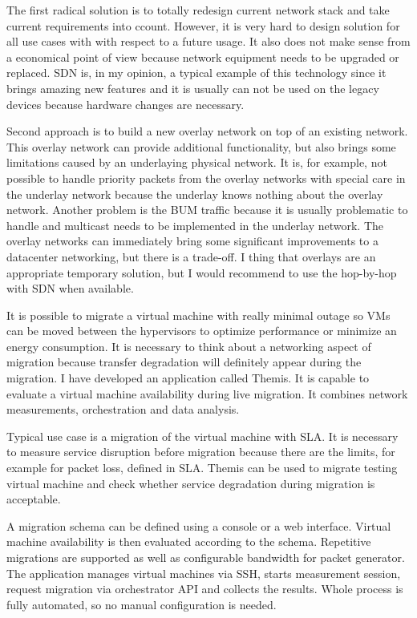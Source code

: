 The first radical solution is to totally redesign current network stack and take current requirements into ccount. However, it is very hard to design solution for all use cases with with respect to a future usage. It also does not make sense from a economical point of view because network equipment needs to be upgraded or replaced. \Ac{SDN} is, in my opinion, a typical example of this technology since it brings amazing new features and it is usually can not be used on the legacy devices because hardware changes are necessary.

Second approach is to build a new overlay network on top of an existing network. This overlay network can provide additional functionality, but also brings some limitations caused by an underlaying physical network. It is, for example, not possible to handle priority packets from the overlay networks with special care in the underlay network because the underlay knows nothing about the overlay network. Another problem is the \Ac{BUM} traffic because it is usually problematic to handle and multicast needs to be implemented in the underlay network.
The overlay networks can immediately bring some significant improvements to a datacenter networking, but there is a trade-off. I thing that overlays are an appropriate temporary solution, but I would recommend to use the hop-by-hop with \Ac{SDN} when available.

It is possible to migrate a virtual machine with really minimal outage so \Ac{VM}s can be moved between the hypervisors to optimize performance or minimize an energy consumption. It is necessary to think about a networking aspect of migration because transfer degradation will definitely appear during the migration. I have developed an application called Themis. It is capable to evaluate a virtual machine availability during live migration. It combines network measurements, orchestration and data analysis.

Typical use case is a migration of the virtual machine with \Ac{SLA}. It is necessary to measure service disruption before migration because there are the limits, for example for packet loss, defined in \Ac{SLA}. Themis can be used to migrate testing virtual machine and check whether service degradation during migration is acceptable.

A migration schema can be defined using a console or a web interface. Virtual machine availability is then evaluated according to the schema. Repetitive migrations are supported as well as configurable bandwidth for packet generator. 
The application manages virtual machines via \Ac{SSH}, starts measurement session, request migration via orchestrator \Ac{API} and collects the results. Whole process is fully automated, so no manual configuration is needed. 

